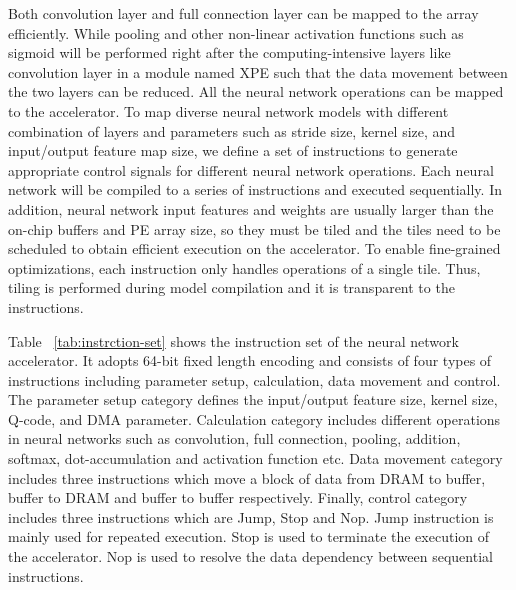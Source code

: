 Both convolution layer and full connection layer can be mapped to the 
array efficiently. While pooling and other non-linear activation functions 
such as sigmoid will be performed right after the computing-intensive 
layers like convolution layer in a module named XPE such that 
the data movement between the two layers can be reduced. 
All the neural network operations can be mapped to the 
accelerator. To map diverse neural 
network models with different combination of layers and parameters such as 
stride size, kernel size, and input/output feature map size, we define 
a set of instructions to generate appropriate control signals 
for different neural network operations. Each neural network 
will be compiled to a series of instructions and executed sequentially. 
In addition, neural network input features and weights 
are usually larger than the on-chip buffers and PE array size, 
so they must be tiled and the tiles need to be scheduled to 
obtain efficient execution on the accelerator. To enable fine-grained 
optimizations, each instruction only handles operations of 
a single tile. Thus, tiling is performed during model
compilation and it is transparent to the instructions.

Table ~\ref{tab:instrction-set} shows the instruction set of the neural 
network accelerator. It adopts 64-bit fixed length encoding 
and consists of four types of instructions including parameter 
setup, calculation, data movement and control. The parameter setup 
category defines the input/output feature size, kernel size, 
Q-code, and DMA parameter. Calculation 
category includes different operations in neural networks such as 
convolution, full connection, pooling, addition, softmax, 
dot-accumulation and activation function etc. Data movement category
includes three instructions which move a block of data 
from DRAM to buffer, buffer to DRAM and buffer to buffer 
respectively. Finally, control category includes three instructions which are 
Jump, Stop and Nop. Jump instruction is mainly used for repeated 
execution. Stop is used to terminate the execution of the accelerator.
Nop is used to resolve the data dependency between sequential 
instructions.

